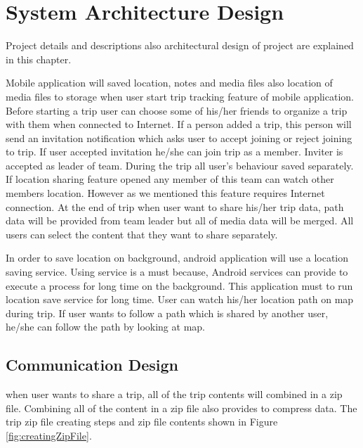 \chapter{System Architecture Design}

Project details and descriptions also architectural design of project are explained in this chapter.

Mobile application will saved location, notes and media files also location of media files to storage when user start trip tracking feature of mobile application. Before starting a trip user can choose some of his/her friends to organize a trip with them when connected to Internet. If a person added a trip, this person will send an invitation notification which asks user to accept joining or reject joining to trip. If user accepted invitation he/she can join trip as a member. Inviter is accepted as leader of team. During the trip all user's behaviour saved separately. If location sharing feature opened any member of this team can watch other members location. However as we mentioned this feature requires Internet connection. At the end of trip when user want to share his/her trip data, path data will be provided from team leader but all of media data will be merged. All users can select the content that they want to share separately.

In order to save location on background, android application will use a location saving service. Using service is a must because, Android services can provide to execute a process for long time on the background. This application must to run location save service for long time. User can watch his/her location path on map during trip. If user wants to follow a path which is shared by another user, he/she can follow the path by looking at map.

\newpage

\section{Communication Design}

when user wants to share a trip, all of the trip contents will combined in a zip file. Combining all of the content in a zip file also provides to compress data. The trip zip file creating steps and zip file contents shown in Figure \ref{fig:creatingZipFile}.

